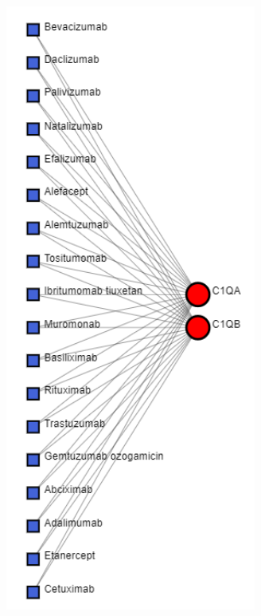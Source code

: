 \begin{figure}[H]
    \centering
    \begin{subfigure}[t]{0.48\textwidth}
        \centering
        \includegraphics[height=20cm, keepaspectratio]{./fig/fig4_14_1.png}
        \label{fig:subnetwork1}
    \end{subfigure}
    \hfill
    \begin{subfigure}[t]{0.48\textwidth}
        \centering

\end{subfigure}
\end{figure}
